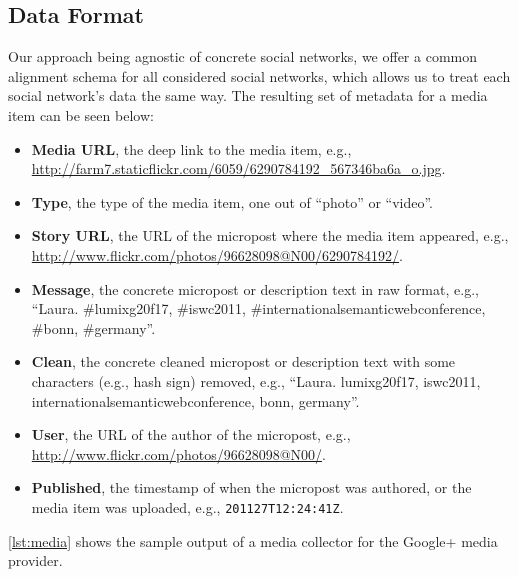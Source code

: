 \documentclass{acm_proc_article-sp}
\newcommand{\inlinelistingsize}{\fontsize{8pt}{11pt}}
\let\oldurl\url
\renewcommand{\url}[1]{\inlinelistingsize\oldurl{#1}}
\begin{document}
\subsection{Data Format}
Our approach being agnostic of concrete social networks, we offer a common alignment schema for all considered social networks, which allows us to treat each social network's data the same way.
The resulting set of metadata for a media item can be seen below:
\begin{itemize}
  \item	\textbf{Media URL}, the deep link to the media item, e.g., \url{http://farm7.staticflickr.com/6059/6290784192_567346ba6a_o.jpg}.
  \item \textbf{Type}, the type of the media item, one out of ``photo'' or ``video''.
  \item \textbf{Story URL}, the URL of the micropost where the media item appeared, e.g., \url{http://www.flickr.com/photos/96628098@N00/6290784192/}.
  \item \textbf{Message}, the concrete micropost or description text in raw format, e.g., ``Laura. \#lumixg20f17, \#iswc2011, \#internationalsemanticwebconference, \#bonn, \#germany''.
  \item \textbf{Clean}, the concrete cleaned micropost or description text with some characters (e.g., hash sign) removed, e.g., ``Laura. lumixg20f17, iswc2011, internationalsemanticwebconference, bonn, germany''.
  \item \textbf{User}, the URL of the author of the micropost, e.g., \url{http://www.flickr.com/photos/96628098@N00/}.
  \item \textbf{Published}, the timestamp of when the micropost was authored, or the media item was uploaded, e.g., \texttt{2011\-27T12:24:41Z}.
\end{itemize}
\autoref{lst:media} shows the sample output of a media collector for the Google+ media provider.
\end{document}
